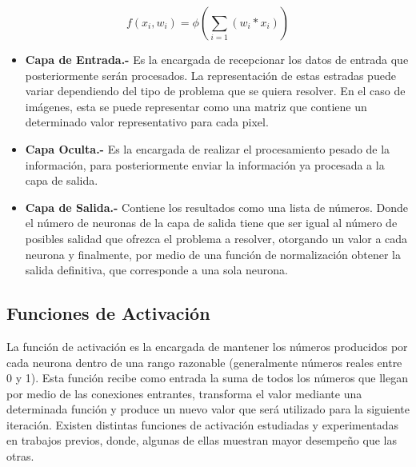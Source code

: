 \begin{equation}\label{eq:neurona}
f(x_i, w_i) = \phi(\sum_{i=1}^{}(w_i * x_i))
\end{equation}


\begin{itemize}
\item \textbf{Capa de Entrada.- }Es la encargada de recepcionar los datos de entrada que posteriormente serán procesados. La representación de estas estradas puede variar dependiendo del tipo de problema que se quiera resolver. En el caso de imágenes, esta se puede representar como una matriz que contiene un determinado valor representativo para cada pixel.
\item \textbf{Capa Oculta.- }Es la encargada de realizar el procesamiento pesado de la información, para posteriormente enviar la información ya procesada a la capa de salida.
\item \textbf{Capa de Salida.-} Contiene los resultados como una lista de números. Donde el número de neuronas de la capa de salida tiene que ser igual al número de posibles salidad que ofrezca el problema a resolver, otorgando un valor a cada neurona y finalmente, por medio de una función de normalización obtener la salida definitiva, que corresponde a una sola neurona.  
\end{itemize}


\subsection{Funciones de Activación}
La función de activación es la encargada de mantener los números producidos por cada neurona dentro de una rango razonable (generalmente números reales entre 0 y 1). Esta función recibe como entrada la suma de todos los números que llegan por medio de las conexiones entrantes, transforma el valor mediante una determinada función y produce un nuevo valor que será utilizado para la siguiente iteración. Existen distintas funciones de activación estudiadas y experimentadas en trabajos previos, donde, algunas de ellas muestran mayor desempeño que las otras.

